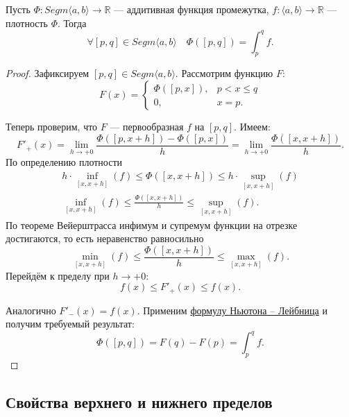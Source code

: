 \hypertarget{afp}{}
\begin{theorem}
	Пусть \(\Phi \colon Segm \langle a, b \rangle \to \mathbb{R}\) --- аддитивная функция промежутка, \(f \colon \langle a, b \rangle \to \mathbb{R}\) --- плотность \(\Phi\). Тогда \[
	\forall [p, q] \in Segm \langle a, b \rangle \quad \Phi([p, q]) = \int_p^q f.
	\]
\end{theorem}

\begin{proof}
	Зафиксируем \([p, q] \in Segm \langle a, b \rangle\). Рассмотрим функцию \(F\): \[
	F(x) =
	\begin{cases}
		\Phi([p, x]), & p < x \leqslant q \\
		0,			  & x = p.
	\end{cases}
	\]
	
	Теперь проверим, что \(F\) --- первообразная \(f\) на \([p, q]\). Имеем: \[
	F'_+(x) = \lim_{h \to +0} \frac{\Phi([p, x + h]) - \Phi([p, x])}{h} = \lim_{h \to +0} \frac{\Phi([x, x + h])}{h}.
	\]
	По определению плотности
	\begin{gather*}
		h \cdot \inf_{[x, x + h]}(f) \leqslant \Phi([x, x + h]) \leqslant h \cdot \sup_{[x, x + h]}(f) \\
		\inf_{[x, x + h]}(f) \leqslant \frac{\Phi([x, x + h])}{h} \leqslant \sup_{[x, x + h]}(f).
	\end{gather*}
	По теореме Вейерштрасса инфимум и супремум функции на отрезке достигаются, то есть неравенство равносильно \[
	\min_{[x, x + h]}(f) \leqslant \frac{\Phi([x, x + h])}{h} \leqslant \max_{[x, x + h]}(f).
	\]
	Перейдём к пределу при \(h \to +0\): \[
	f(x) \leqslant F'_+(x) \leqslant f(x).
	\]
	
	Аналогично \(F'_-(x) = f(x)\). Применим \hyperlink{t9}{формулу Ньютона -- Лейбница} и получим требуемый результат: \[
	\Phi([p, q]) = F(q) - F(p) = \int_p^q f.
	\]
\end{proof}

\subsection{\color{red} Свойства верхнего и нижнего пределов}

